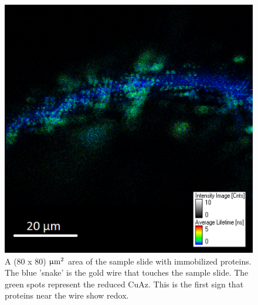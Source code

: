 \documentclass[twoside,single]{lion-msc}
\begin{document}
\begin{figure}[ht!]
\centering
\includegraphics[width=\textwidth]{goldwire_1}
\caption{A (80 x 80) $\upmu \textup{m}^{2}$ area of the sample slide with immobilized proteins. The blue 'snake' is the gold wire that touches the sample slide. The green spots represent the reduced CuAz. This is the first sign that proteins near the wire show redox.}
\label{goldenwire_1}
\end{figure}
\end{document}
